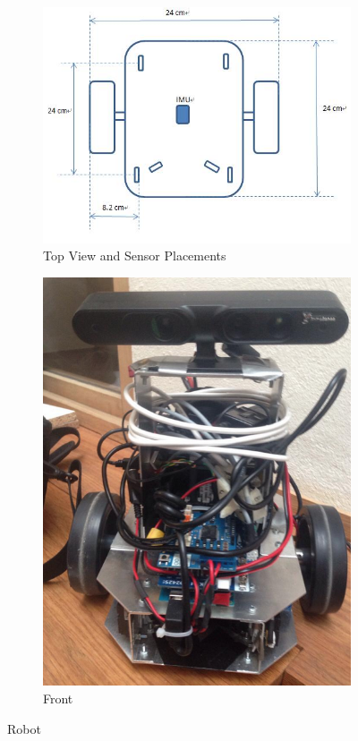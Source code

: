 \begin{figure}
\centering

\begin{subfigure}[t]{0.4\textwidth}
\includegraphics[width=\textwidth]{figures/dimensions.jpg}
\caption{Top View and Sensor Placements} 
\label{fig:robot_dim}
\end{subfigure}
\quad
\begin{subfigure}[t]{0.4\textwidth}
\includegraphics[width=\textwidth]{figures/robot.png}
\caption{Front} 
\label{fig:robot}
\end{subfigure}

\caption{Robot}
\end{figure}


